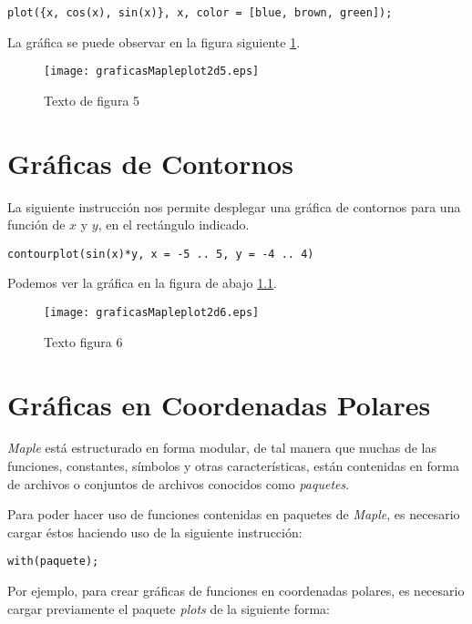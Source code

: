 \documentclass[letterpaper,12pt]{book}
\begin{document}
\begin{verbatim}
plot({x, cos(x), sin(x)}, x, color = [blue, brown, green]);
\end{verbatim}

La gráfica se puede observar en la figura siguiente \ref{cap3f1}.

\begin{figure}[h!]
\centering
\texttt{[image: graficasMapleplot2d5.eps]}
\caption{Texto de figura 5}\label{cap3f1}
\end{figure}

\chapter{Gráficas de Contornos}

La siguiente instrucción nos permite desplegar una gráfica de contornos para una función de
$x$ y $y$, en el rectángulo indicado.

\begin{verbatim}
contourplot(sin(x)*y, x = -5 .. 5, y = -4 .. 4)
\end{verbatim}

Podemos ver la gráfica en la figura de abajo \ref{cap4f1}.

\begin{figure}[h!]
\centering
\texttt{[image: graficasMapleplot2d6.eps]}
\caption{Texto figura 6}\label{cap4f1}
\end{figure}


\chapter{Gráficas en Coordenadas Polares}

\emph{Maple} está estructurado en forma modular, de tal manera que muchas de las
funciones, constantes, símbolos y otras características, están contenidas en forma
de archivos o conjuntos de archivos conocidos como \emph{paquetes}. 

Para poder hacer uso de funciones contenidas en paquetes de \emph{Maple}, es 
necesario cargar éstos haciendo uso de la siguiente instrucción:

\begin{verbatim}
with(paquete);
\end{verbatim}

Por ejemplo, para crear gráficas de funciones en coordenadas polares, es necesario
cargar previamente el paquete \emph{plots} de la siguiente forma:
\end{document}
